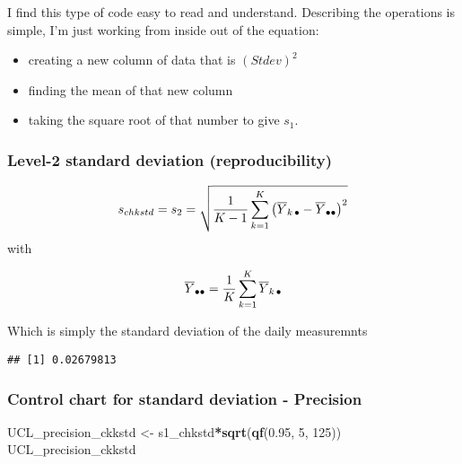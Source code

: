 \documentclass[]{book}
\newenvironment{Shaded}{\begin{snugshade}}{\end{snugshade}}
\newcommand{\DecValTok}[1]{\textcolor[rgb]{0.00,0.00,0.81}{#1}}
\newcommand{\FloatTok}[1]{\textcolor[rgb]{0.00,0.00,0.81}{#1}}
\newcommand{\KeywordTok}[1]{\textcolor[rgb]{0.13,0.29,0.53}{\textbf{#1}}}
\newcommand{\NormalTok}[1]{#1}
\newcommand{\OperatorTok}[1]{\textcolor[rgb]{0.81,0.36,0.00}{\textbf{#1}}}
\newcommand{\StringTok}[1]{\textcolor[rgb]{0.31,0.60,0.02}{#1}}
\providecommand{\tightlist}{%
  \setlength{\itemsep}{0pt}\setlength{\parskip}{0pt}}
\theoremstyle{definition}
\theoremstyle{definition}
\theoremstyle{definition}
\theoremstyle{remark}
\begin{document}
I find this type of code easy to read and understand. Describing the
operations is simple, I'm just working from inside out of the equation:

\begin{itemize}
\tightlist
\item
  creating a new column of data that is \((Stdev)^2\)
\item
  finding the mean of that new column
\item
  taking the square root of that number to give \(s_1\).
\end{itemize}

\hypertarget{level-2-standard-deviation-reproducibility}{%
\subsubsection{Level-2 standard deviation
(reproducibility)}\label{level-2-standard-deviation-reproducibility}}

\[
s_{chkstd} = {\large s}_2 = \sqrt{\frac{1}{K-1} \sum_{k=1}^{K} \left( \overline{Y}_{k \, \small{\bullet}} - \overline{Y}_{\small{\bullet}  \small{\bullet}} \right) ^2}
\] with

\[
\overline{Y}_{\small{\bullet} \small{\bullet}}  = \frac{1}{K} \sum_{k=1}^{K} \overline{Y}_{k \, \small{\bullet}}
\]

Which is simply the standard deviation of the daily measuremnts

\begin{Shaded}
\end{Shaded}

\begin{verbatim}
## [1] 0.02679813
\end{verbatim}

\hypertarget{control-chart-for-standard-deviation---precision}{%
\subsubsection{Control chart for standard deviation -
Precision}\label{control-chart-for-standard-deviation---precision}}

\begin{Shaded}
\begin{Highlighting}[]
\NormalTok{UCL_precision_ckkstd <-}\StringTok{ }\NormalTok{s1_chkstd}\OperatorTok{*}\KeywordTok{sqrt}\NormalTok{(}\KeywordTok{qf}\NormalTok{(}\FloatTok{0.95}\NormalTok{, }\DecValTok{5}\NormalTok{, }\DecValTok{125}\NormalTok{))}
\NormalTok{UCL_precision_ckkstd}
\end{Highlighting}
\end{Shaded}
\end{document}
